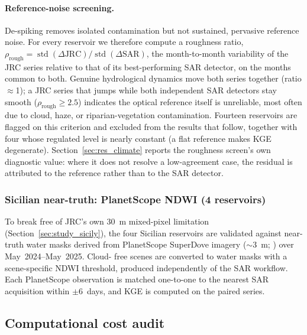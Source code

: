 \paragraph{Reference-noise screening.} De-spiking removes isolated
contamination but not sustained, pervasive reference noise. For every
reservoir we therefore compute a roughness ratio,
$\rho_{\text{rough}} = \operatorname{std}(\Delta\text{JRC}) /
\operatorname{std}(\Delta\text{SAR})$, the month-to-month variability of the
JRC series relative to that of its best-performing SAR detector, on the
months common to both. Genuine hydrological dynamics move both series
together (ratio $\approx$1); a JRC series that jumps while both independent
SAR detectors stay smooth ($\rho_{\text{rough}} \geq 2.5$) indicates the
optical reference itself is unreliable, most often due to cloud, haze, or
riparian-vegetation contamination. Fourteen reservoirs are flagged on this
criterion and excluded from the results that follow, together with four whose
regulated level is nearly constant (a flat reference makes KGE degenerate).
Section~\ref{sec:res_climate}
reports the roughness screen's own diagnostic value: where it does not
resolve a low-agreement case, the residual is attributed to the reference
rather than to the SAR detector.

\subsubsection{Sicilian near-truth: PlanetScope NDWI (4 reservoirs)}
\label{sec:val_sicily}

To break free of JRC's own 30~m mixed-pixel limitation
(Section~\ref{sec:study_sicily}), the four Sicilian reservoirs are
validated against near-truth water masks derived from PlanetScope SuperDove
imagery ($\sim$3~m; \citealp{PlanetTeam2017}) over May~2024--May~2025. Cloud-
free scenes are converted to water masks with a scene-specific NDWI threshold,
produced independently of the SAR workflow. Each PlanetScope observation is
matched one-to-one to the nearest SAR acquisition within $\pm$6~days, and
KGE is computed on the paired series.


\subsection{Computational cost audit}
\label{sec:methods_cost}

